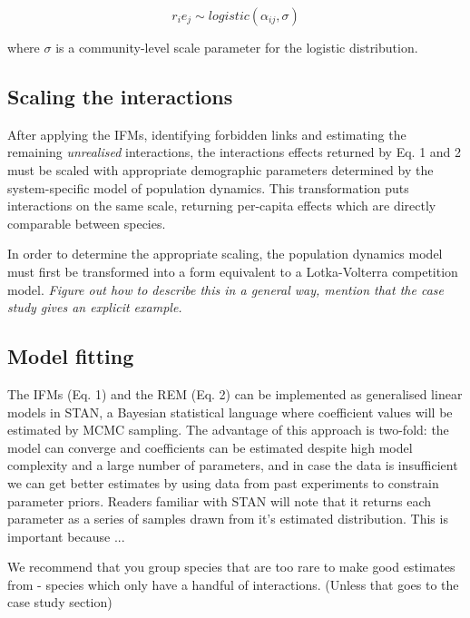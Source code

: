 \documentclass[a4,12pt]{article}
\begin{document}
        \begin{equation}
        r_i e_j \sim logistic \left ( \alpha_{ij}, \sigma \right )
        \label{unrealised}
        \end{equation}
    
        where $\sigma$ is a community-level scale parameter for the logistic distribution. 
        
    \subsection{Scaling the interactions}
        
        After applying the IFMs, identifying forbidden links and estimating the remaining \textit{unrealised} interactions, the interactions effects returned by Eq. 1 and 2 must be scaled with appropriate demographic parameters determined by the system-specific model of population dynamics. This transformation puts interactions on the same scale, returning per-capita effects which are directly comparable between species. 
        
        In order to determine the appropriate scaling, the population dynamics model must first be transformed into a form equivalent to a Lotka-Volterra competition model. \textit{Figure out how to describe this in a general way, mention that the case study gives an explicit example.}
        
    \subsection{Model fitting}
        
        The IFMs (Eq. 1) and the REM (Eq. 2) can be implemented as generalised linear models in STAN, a Bayesian statistical language where coefficient values will be estimated by MCMC sampling. The advantage of this approach is two-fold: the model can converge and coefficients can be estimated despite high model complexity and a large number of parameters, and in case the data is insufficient we can get better estimates by using data from past experiments to constrain parameter priors. Readers familiar with STAN will note that it returns each parameter as a series of samples drawn from it's estimated distribution. This is important because ...

        We recommend that you group species that are too rare to make good estimates from - species which only have a handful of interactions. (Unless that goes to the case study section)
    
\end{document}

